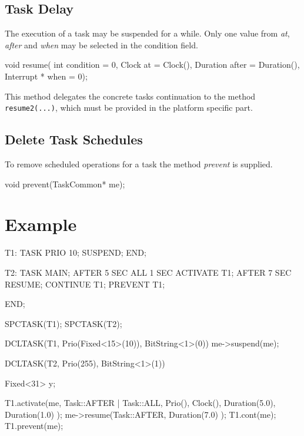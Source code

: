 \subsection{Task Delay}
The execution of a task may be suspended for a while.
Only one value from {\em at}, {\em after} and {\em when} may be selected
in the condition field. 


\begin{CppCode}
void resume( int condition = 0,
             Clock at = Clock(),
             Duration after = Duration(),
             Interrupt * when = 0);
\end{CppCode}
This method delegates the concrete tasks continuation to the method
\verb|resume2(...)|,
which must be provided in the platform specific part.


\subsection{Delete Task Schedules}
To remove scheduled operations for a task the method {\em prevent} is supplied.

\begin{CppCode}
void prevent(TaskCommon* me);
\end{CppCode}

\section{Example}
\begin{PEARLCode}
T1: TASK PRIO 10;
   SUSPEND;
END;

T2: TASK MAIN;
   AFTER 5 SEC ALL 1 SEC ACTIVATE T1;
   AFTER 7 SEC RESUME;
   CONTINUE T1;
   PREVENT T1;
   
END;
\end{PEARLCode}

\begin{CppCode}
SPCTASK(T1);
SPCTASK(T2);

DCLTASK(T1, Prio(Fixed<15>(10)), BitString<1>(0)) {
  me->suspend(me);
}

DCLTASK(T2, Prio(255), BitString<1>(1)) {
  Fixed<31> y;

  T1.activate(me,
              Task::AFTER | Task::ALL,
              Prio(),
              Clock(),
              Duration(5.0),
              Duration(1.0) );
  me->resume(Task::AFTER, Duration(7.0) );
  T1.cont(me);
  T1.prevent(me);
}

\end{CppCode}
\fi

